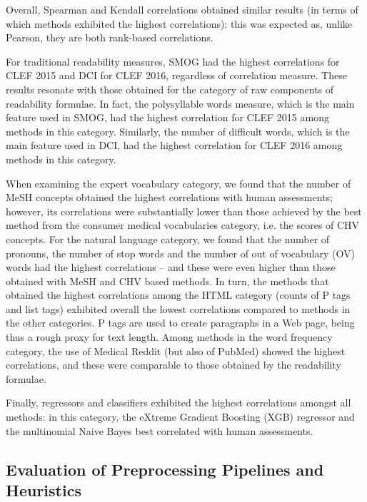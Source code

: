 \documentclass[10pt,a4paper]{article}
\begin{document}
Overall, Spearman and Kendall correlations obtained similar results (in terms of which methods exhibited the highest correlations): this was expected as, unlike Pearson, they are both rank-based correlations.

For traditional readability measures, SMOG had the highest correlations for CLEF 2015 and DCI for CLEF 2016, regardless of correlation measure. These results resonate with those obtained for the category of raw components of readability formulae. 
In fact, the polysyllable words measure, which is the main feature used in SMOG, had the highest correlation for CLEF 2015 among methods in this category. Similarly, the number of difficult words, which is the main feature used in DCI, had the highest correlation for CLEF 2016 among methods in this category.

When examining the expert vocabulary category, we found that the number of MeSH concepts obtained the highest correlations with human assessments; however, its correlations were substantially lower than those achieved by the best method from the consumer medical vocabularies category, i.e. the scores of CHV concepts. For the natural language category, we found that the number of pronouns, the number of stop words and the number of out of vocabulary (OV) words had the highest correlations -- and these were even higher than those obtained with MeSH and CHV based methods. In turn, the methods that obtained the highest correlations among the HTML category (counts of P tags and list tags) exhibited overall the lowest correlations compared to methods in the other categories. P tags are used to create paragraphs in a Web page, being thus a rough proxy for text length. 
Among methods in the word frequency category, the use of Medical Reddit (but also of PubMed) showed the highest correlations, and these were comparable to those obtained by the readability formulae. 

Finally, regressors and classifiers exhibited the highest correlations amongst all methods: in this  category, the  eXtreme Gradient Boosting (XGB) regressor and the multinomial Naive Bayes best correlated with human assessments. 

\subsection*{Evaluation of Preprocessing Pipelines and Heuristics}
\label{sec:which_preprocessing}
\end{document}
